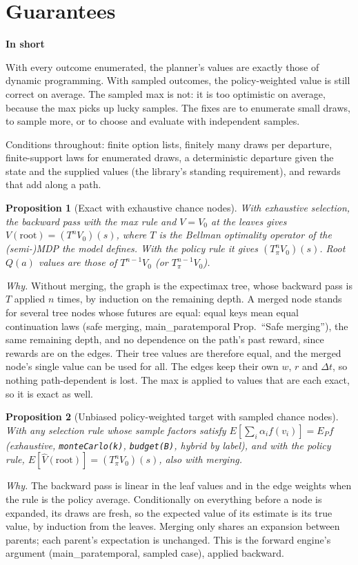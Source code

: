 \documentclass[11pt]{article}
\newcommand{\code}[1]{\texttt{#1}}
\newcommand{\shadedbox}[3]{\par\smallskip\noindent\colorbox{#1}{\parbox{\dimexpr\linewidth-2\fboxsep}{\textbf{#2}\par #3}}\par\smallskip}
\newcommand{\takeaway}[1]{\shadedbox{okbg}{In short}{#1}}
\theoremstyle{plain}
\newtheorem{proposition}{Proposition}
\begin{document}
\section{Guarantees}\label{sec:guarantees}

\takeaway{With every outcome enumerated, the planner's values are exactly those of dynamic programming. With sampled
outcomes, the policy-weighted value is still correct on average. The sampled max is not: it is too optimistic on
average, because the max picks up lucky samples. The fixes are to enumerate small draws, to sample more, or to choose
and evaluate with independent samples.}

Conditions throughout: finite option lists, finitely many draws per departure, finite-support laws for enumerated
draws, a deterministic departure given the state and the supplied values (the library's standing requirement), and
rewards that add along a path.

\begin{proposition}[Exact with exhaustive chance nodes]
With exhaustive selection, the backward pass with the max rule and $V=V_0$ at the leaves gives
$V(\text{root})=(T^n V_0)(s)$, where $T$ is the Bellman optimality operator of the (semi-)MDP the model defines. With
the policy rule it gives $(T_\pi^n V_0)(s)$. Root $Q(a)$ values are those of $T^{n-1}V_0$ (or $T_\pi^{n-1}V_0$).
\end{proposition}
\emph{Why.} Without merging, the graph is the expectimax tree, whose backward pass is $T$ applied $n$ times, by
induction on the remaining depth. A merged node stands for several tree nodes whose futures are equal: equal keys
mean equal continuation laws (safe merging, main\_paratemporal Prop.~``Safe merging''), the same remaining depth, and
no dependence on the path's past reward, since rewards are on the edges. Their tree values are therefore equal, and
the merged node's single value can be used for all. The edges keep their own $w$, $r$ and $\Delta t$, so nothing
path-dependent is lost. The max is applied to values that are each exact, so it is exact as well.

\begin{proposition}[Unbiased policy-weighted target with sampled chance nodes]
With any selection rule whose sample factors satisfy $E[\sum_i \alpha_i f(v_i)] = E_P f$ (exhaustive,
\code{monteCarlo(k)}, \code{budget(B)}, hybrid by label), and with the policy rule, $E[\hat V(\text{root})]
=(T_\pi^n V_0)(s)$, also with merging.
\end{proposition}
\emph{Why.} The backward pass is linear in the leaf values and in the edge weights when the rule is the policy
average. Conditionally on everything before a node is expanded, its draws are fresh, so the expected value of its
estimate is its true value, by induction from the leaves. Merging only shares an expansion between parents; each
parent's expectation is unchanged. This is the forward engine's argument (main\_paratemporal, sampled case), applied
backward.
\end{document}

